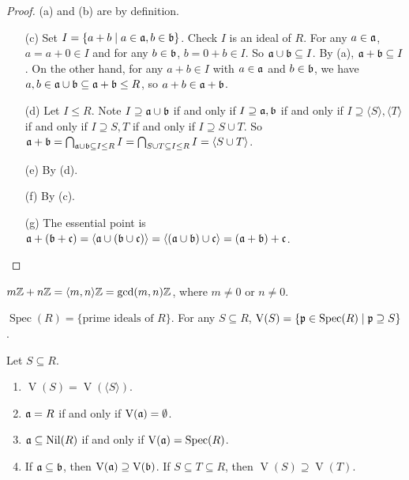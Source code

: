 \begin{proof}
    (a) and (b) are by definition.
    \begin{enumerate}
        \item [(c)]
            Set $I = \{a+b \mid a \in \mathfrak{a},b \in \mathfrak{b}\}$. Check $I$ is an ideal of $R$. For any $a \in \mathfrak{a}$, $a = a + 0 \in I$ and for any $b \in \mathfrak{b}$, $b = 0 + b \in I$. So $\mathfrak{a} \cup \mathfrak{b} \subseteq I$. By (a), $\mathfrak{a} + \mathfrak{b} \subseteq I$. On the other hand, for any $a+b \in I$ with $a \in \mathfrak{a}$ and $b \in \mathfrak{b}$, we have $a,b \in \mathfrak{a} \cup \mathfrak{b} \subseteq \mathfrak{a} + \mathfrak{b} \leq R$, so $a + b \in \mathfrak{a} + \mathfrak{b}$.
        \item[(d)] Let $I \leq R$. Note $I \supseteq \mathfrak{a} \cup \mathfrak{b}$ if and only if $I \supseteq \mathfrak{a},\mathfrak{b}$ if and only if $I \supseteq \langle S \rangle, \langle T \rangle$ if and only if $I \supseteq S,T$ if and only if $I \supseteq S \cup T$. So $\mathfrak{a} + \mathfrak{b} = \bigcap_{\mathfrak{a} \cup \mathfrak{b} \subseteq I \leq R} I = \bigcap_{S \cup T \subseteq I \leq R} I = \langle S \cup T \rangle$.
        \item[(e)] By (d).
        \item[(f)] By (c).
        \item[(g)] The essential point is $\mathfrak{a} + (\mathfrak{b} + \mathfrak{c}) = \langle \mathfrak{a} \cup (\mathfrak{b} \cup \mathfrak{c}) \rangle = \langle (\mathfrak{a} \cup \mathfrak{b}) \cup \mathfrak{c} \rangle = (\mathfrak{a} + \mathfrak{b}) + \mathfrak{c}$. \qedhere
    \end{enumerate}
\end{proof}

\begin{example*}
    $m\mathbb{Z} + n\mathbb{Z} = \langle m,n \rangle\mathbb{Z} = \operatorname{gcd}(m,n)\mathbb{Z}$, where $m \neq 0$ or $n \neq 0$.
\end{example*}

\begin{recall*}
    $\operatorname{Spec}(R) = \{\text{prime ideals of $R$}\}$. For any $S \subseteq R$, $\operatorname{V}(S) = \{\mathfrak{p} \in \operatorname{Spec}(R) \mid \mathfrak{p} \supseteq S\}$.
\end{recall*}

\begin{proposition}
    Let $S \subseteq R$.
    \begin{enumerate}
        \item $\operatorname{V}(S) = \operatorname{V}(\langle S \rangle)$. 
        \item $\mathfrak{a} = R$ if and only if $\operatorname{V}(\mathfrak{a}) = \emptyset$.
        \item $\mathfrak{a} \subseteq \operatorname{Nil}(R)$ if and only if $\operatorname{V}(\mathfrak{a}) = \operatorname{Spec}(R)$.
        \item If $\mathfrak{a} \subseteq \mathfrak{b}$, then $\operatorname{V}(\mathfrak{a}) \supseteq \operatorname{V}(\mathfrak{b})$. If $S \subseteq T \subseteq R$, then $\operatorname{V}(S) \supseteq \operatorname{V}(T)$.
    \end{enumerate}
\end{proposition}

